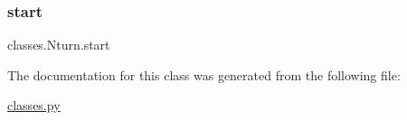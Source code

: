 \mbox{\label{classclasses_1_1Nturn_a7b82c733774784bd404e6641ad5de43b}} 
\subsubsection{\texorpdfstring{start}{start}}
{\footnotesize\ttfamily classes.\+Nturn.\+start}



The documentation for this class was generated from the following file\+:\begin{DoxyCompactItemize}
\item 
\hyperlink{classes_8py}{classes.\+py}\end{DoxyCompactItemize}
